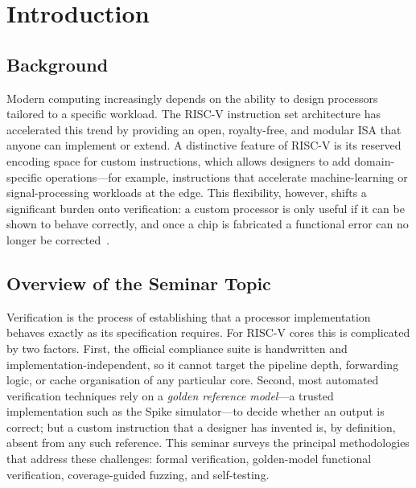 \documentclass[12pt,a4paper]{report}
\begin{document}
\clearpage
{}
\listoftables

\clearpage
\tableofcontents

\clearpage
{}
\setcounter{page}{1}

\chapter{Introduction}

\section{Background}
Modern computing increasingly depends on the ability to design processors tailored to a
specific workload. The RISC-V instruction set architecture has accelerated this trend by
providing an open, royalty-free, and modular ISA that anyone can implement or extend. A
distinctive feature of RISC-V is its reserved encoding space for custom instructions, which
allows designers to add domain-specific operations---for example, instructions that
accelerate machine-learning or signal-processing workloads at the edge. This flexibility,
however, shifts a significant burden onto verification: a custom processor is only useful if
it can be shown to behave correctly, and once a chip is fabricated a functional error can
no longer be corrected~\cite{riscvman}.

\section{Overview of the Seminar Topic}
Verification is the process of establishing that a processor implementation behaves exactly
as its specification requires. For RISC-V cores this is complicated by two factors. First,
the official compliance suite is handwritten and implementation-independent, so it cannot
target the pipeline depth, forwarding logic, or cache organisation of any particular core.
Second, most automated verification techniques rely on a \emph{golden reference model}---a
trusted implementation such as the Spike simulator---to decide whether an output is
correct; but a custom instruction that a designer has invented is, by definition, absent
from any such reference. This seminar surveys the principal methodologies that address
these challenges: formal verification, golden-model functional verification, coverage-guided
fuzzing, and self-testing.
\end{document}

